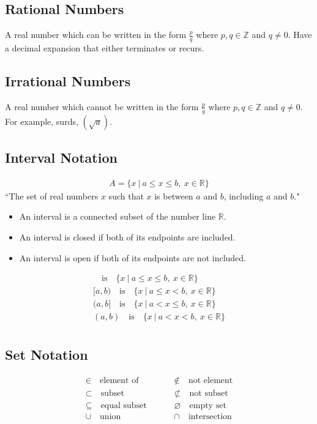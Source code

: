\documentclass[10pt, a4paper, titlepage]{article}
\begin{document}
\begin{multicols*}{3}
\dotfill
\subsection{Rational Numbers}
A real number which can be written in the form $\frac{p}{q}$ where $p,q\in \mathbb{Z}$ and $q\neq 0$. Have a decimal expansion that either terminates or recurs.\\

\dotfill
\subsection{Irrational Numbers}
A real number which cannot be written in the form $\frac{p}{q}$ where $p,q\in \mathbb{Z}$ and $q\neq 0$. For example, surds, $(\sqrt{a})$.\\

\dotfill
\subsection{Interval Notation}
\begin{align}
	A=\{x\ |\ a\leq x\leq b,\ x\in \mathbb{R}\}
\end{align}
``The set of real numbers $x$ such that $x$ is between $a$ and $b$, including $a$ and $b$."
\begin{itemize}
	\item An interval is a connected subset of the number line $\mathbb{R}$.
	\item An interval is closed if both of its endpoints are included.
	\item An interval is open if both of its endpoints are not included.
\end{itemize}
\begin{align}
	[a,b]\quad \text{is}\quad \{x\ |\ a\leq x\leq b,\ x\in \mathbb{R}\}\\
	[a,b)\quad \text{is}\quad \{x\ |\ a\leq x<b,\ x\in \mathbb{R}\}\\
	(a,b]\quad \text{is}\quad \{x\ |\ a<x\leq b,\ x\in \mathbb{R}\}\\
	(a,b)\quad \text{is}\quad \{x\ |\ a<x<b,\ x\in \mathbb{R}\}\\
\end{align}
\dotfill
\subsection{Set Notation}
\begin{align}
	&\in \quad \text{element of}&& &&\notin \quad \text{not element}&\\
	&\subset \quad \text{subset}&& &&\not\subset \quad \text{not subset}&\\
	&\subseteq \quad \text{equal subset}&& &&\varnothing \quad \text{empty set}\\
	&\cup \quad \text{union}&& &&\cap \quad \text{intersection}&	
\end{align}
\dotfill

\end{multicols*}
\end{document}
